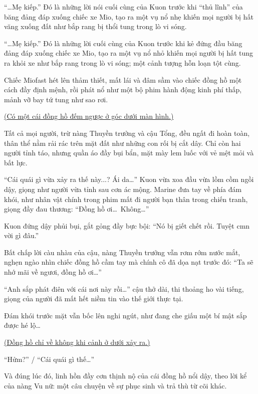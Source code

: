 \documentclass[../main.tex]{subfiles}
\begin{document}
``\dots Mẹ kiếp.'' Đó là những lời nói cuối cùng của Kuon trước khi ``thủ lĩnh'' của băng đảng  đáp xuống chiếc xe Mio, tạo ra một vụ nổ nhẹ khiến mọi người bị hất văng xuống đất như bắp rang bị thổi tung trong lò vi sóng.

``\dots Mẹ kiếp.'' Đó là những lời cuối cùng của Kuon trước khi kẻ đứng đầu băng đảng đáp xuống chiếc xe Mio, tạo ra một vụ nổ nhỏ khiến mọi người bị hất tung ra khỏi xe như bắp rang trong lò vi sóng; một cảnh tượng hỗn loạn tột cùng.

Chiếc Miofast hét lên thảm thiết, mất lái và đâm sầm vào chiếc đồng hồ một cách đầy định mệnh, rồi phát nổ như một bộ phim hành động kinh phí thấp, mảnh vỡ bay tứ tung như sao rơi.

\begin{center}
  \uline{(Có một cái đồng hồ đếm ngược ở góc dưới màn hình.)}
\end{center}

Tất cả mọi người, trừ nàng Thuyền trưởng và cậu Tổng, đều ngất đi hoàn toàn, thân thể nằm rải rác trên mặt đất như những con rối bị cắt dây. Chỉ còn hai người tỉnh táo, nhưng quần áo đầy bụi bẩn, mặt mày lem luốc với vẻ mệt mỏi và bất lực.

``Cái quái gì vừa xảy ra thế này...? Ái da\dots'' Kuon vừa xoa đầu vừa lồm cồm ngồi dậy, giọng như người vừa tỉnh sau cơn ác mộng. Marine đưa tay về phía đám khói, như nhân vật chính trong phim mất đi người bạn thân trong chiến tranh, giọng đầy đau thương: ``Đồng hồ ơi\dots\ Không\dots''

Kuon đứng dậy phủi bụi, gắt gỏng đầy bực bội: ``Nó bị giết chết rồi. Tuyệt cmn vời gì đâu.''

Bất chấp lời càu nhàu của cậu, nàng Thuyền trưởng vẫn rơm rớm nước mắt, nghẹn ngào nhìn chiếc đồng hồ cầm tay mà chính cô đã dọa nạt trước đó: ``Ta sẽ nhớ mãi về ngươi, đồng hồ ơi\dots''

``Anh sắp phát điên với cái nơi này rồi\dots'' cậu thở dài, thi thoảng ho vài tiếng, giọng của người đã mất hết niềm tin vào thế giới thực tại.

Đám khói trước mặt vẫn bốc lên nghi ngút, như đang che giấu một bí mật sắp được hé lộ\dots

\begin{center}
  \uline{(Đồng hồ chỉ về không khi cảnh ở dưới xảy ra.)}
\end{center}

``Hửm?'' / ``Cái quái gì thế\dots''

Và đúng lúc đó, linh hồn đầy cơn thịnh nộ của cái đồng hồ nổi dậy, theo lời kể của nàng Vu nữ: một câu chuyện về sự phục sinh và trả thù từ cõi khác.
\end{document}
